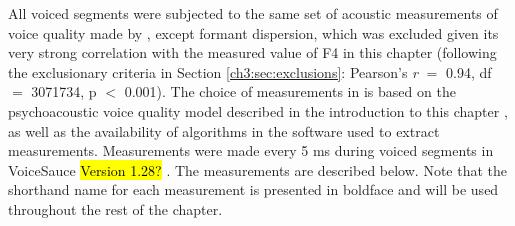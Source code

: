 All voiced segments were subjected to the same set of acoustic measurements of voice quality made by \citet{lee_2019_acoustic}, except formant dispersion, which was excluded given its very strong correlation with the measured value of F4 in this chapter (following the exclusionary criteria in Section \ref{ch3:sec:exclusions}: Pearson's \textit{r} $=$ 0.94, df $=$ 3071734, p $<$ 0.001). The choice of measurements in \citet{lee_2019_acoustic} is based on the psychoacoustic voice quality model described in the introduction to this chapter \citep{kreiman_2014_theory}, as well as the availability of algorithms in the software used to extract measurements. Measurements were made every 5 ms during voiced segments in VoiceSauce \hl{Version 1.28?} \citep{shue_2011_voicesauce}. The measurements are described below. Note that the shorthand name for each measurement is presented in boldface and will be used throughout the rest of the chapter. 

